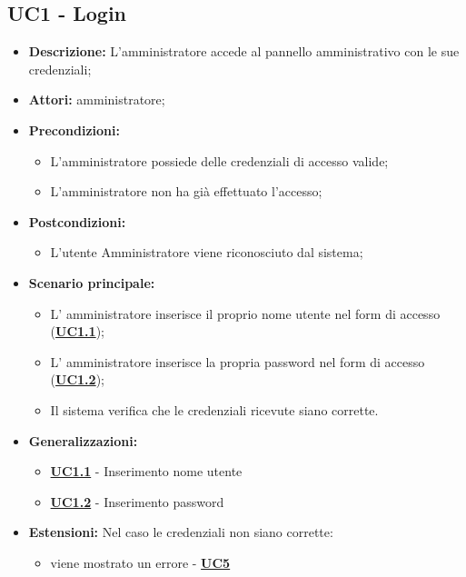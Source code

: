 \subsection{UC1 - Login}
\label{sec:UC1}
\begin{itemize}
	\item \textbf{Descrizione:} L’amministratore accede al pannello amministrativo con le sue credenziali;
	\item \textbf{Attori:} amministratore;
	\item \textbf{Precondizioni:} 
	\begin{itemize}
		\item L’amministratore possiede delle credenziali di accesso valide;
		\item L’amministratore non ha già effettuato l’accesso;
	\end{itemize}
	\item \textbf{Postcondizioni:} 
	\begin{itemize}
		\item L’utente Amministratore viene riconosciuto dal sistema;
	\end{itemize}
	\item \textbf{Scenario principale:} 
	\begin{itemize}
		\item L’ amministratore inserisce il proprio nome utente nel form di accesso (\hyperref[sec:UC1.1]{\textbf{UC1.1}});
		\item L’ amministratore inserisce la propria password nel form di accesso (\hyperref[sec:UC1.2]{\textbf{UC1.2}});
		\item Il sistema verifica che le credenziali ricevute siano corrette. 
	\end{itemize}
	\item \textbf{Generalizzazioni:} 
	\begin{itemize}
		\item \hyperref[sec:UC1.1]{\textbf{UC1.1}} - Inserimento nome utente
		\item \hyperref[sec:UC1.2]{\textbf{UC1.2}} - Inserimento password
	\end{itemize}
	\item \textbf{Estensioni:} Nel caso le credenziali non siano corrette:
	\begin{itemize}
		\item viene mostrato un errore - \hyperref[sec:UC5]{\textbf{UC5}}
	\end{itemize}
\end{itemize}


